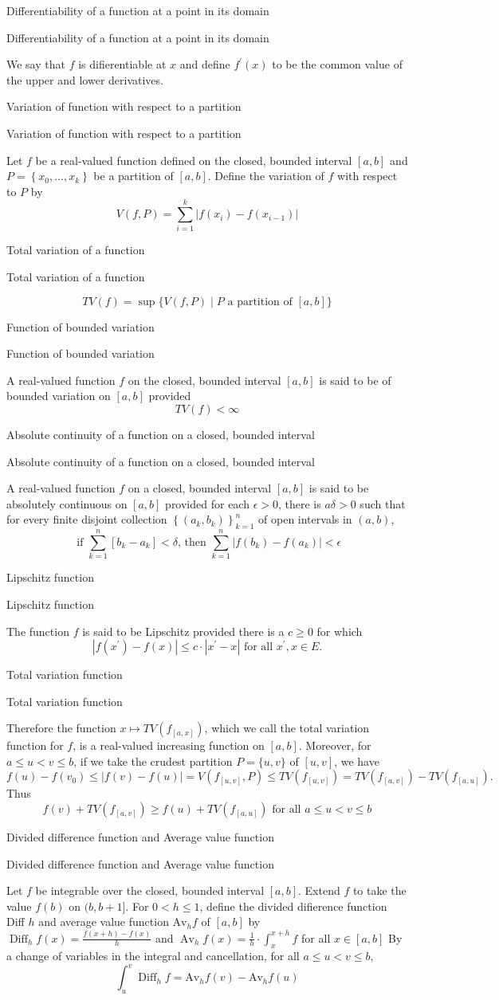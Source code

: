 \documentclass[17pt]{extarticle}
\newcommand{\boxset}[2]{\begin{mdframed}[style=darkQuesion]
#1
\end{mdframed}
\newpage
\begin{mdframed}[style=darkQuesion]
#1
  \end{mdframed}
\begin{mdframed}[style=darkAnswer]
#2
  \end{mdframed}
  \newpage
}
\begin{document}
\boxset{Differentiability of a function at a point in its domain}
{
We say that $f$ is difierentiable at $x$ and define $f^{\prime}(x)$ to be the common value of the upper and lower derivatives.
}%
\boxset{Variation of function with respect to a partition}
{
Let $f$ be a real-valued function defined on the closed, bounded interval $[a, b]$ and $P=\left\{x_{0}, \ldots, x_{k}\right\}$ be a partition of $[a, b]$. Define the variation of $f$ with respect to $P$ by
\[
V(f, P)=\sum_{i=1}^{k}\left|f\left(x_{i}\right)-f\left(x_{i-1}\right)\right|
\]
}%
\boxset{Total variation of a function}
{
\[T V(f)=\sup \{V(f, P) \mid P \text { a partition of }[a, b]\}\]
}%
\boxset{Function of bounded variation}
{
A real-valued function $f$ on the closed, bounded interval $[a, b]$ is said to be of bounded variation on $[a, b]$ provided
\[
T V(f)<\infty
\]
}%
\boxset{Absolute continuity of a function on a closed, bounded interval}
{
A real-valued function $f$ on a closed, bounded interval $[a, b]$ is said to be absolutely continuous on $[a, b]$ provided for each $\epsilon>0$, there is $a \delta>0$ such that for every finite disjoint collection $\left\{\left(a_{k}, b_{k}\right)\right\}_{k=1}^{n}$ of open intervals in $(a, b)$,
\[
\text { if } \sum_{k=1}^{n}\left[b_{k}-a_{k}\right]<\delta \text {, then } \sum_{k=1}^{n}\left|f\left(b_{k}\right)-f\left(a_{k}\right)\right|<\epsilon
\]
}%
\boxset{Lipschitz function}
{
The function $f$ is said to be Lipschitz provided there is a $c \geq 0$ for which
\[
\left|f\left(x^{\prime}\right)-f(x)\right| \leq c \cdot\left|x^{\prime}-x\right| \text { for all } x^{\prime}, x \in E .
\]
}%
\boxset{Total variation function}
{
Therefore the function $x \mapsto T V\left(f_{[a, x]}\right)$, which we call the total variation function for $f$, is a real-valued increasing function on $[a, b]$. Moreover, for $a \leq u<v \leq b$, if we take the crudest partition $P=\{u, v\}$ of $[u, v]$, we have
\[
f(u)-f\left(v_{0}\right) \leq|f(v)-f(u)|=V\left(f_{[u, v]}, P\right) \leq T V\left(f_{[u, v]}\right)=T V\left(f_{[a, v]}\right)-T V\left(f_{[a, u]}\right) .
\]
Thus
\[
f(v)+T V\left(f_{[a, v]}\right) \geq f(u)+T V\left(f_{[a, u]}\right) \text { for all } a \leq u<v \leq b
\]
}%
\boxset{Divided difference function and Average value function}
{
Let $f$ be integrable over the closed, bounded interval $[a, b]$. Extend $f$ to take the value $f(b)$ on $(b, b+1]$. For $0<h \leq 1$, define the divided difierence function Diff $h$ and average value function $\mathrm{Av}_{h} f$ of $[a, b]$ by
$\operatorname{Diff}_{h} f(x)=\frac{f(x+h)-f(x)}{h}$ and $\operatorname{Av}_{h} f(x)=\frac{1}{h} \cdot \int_{x}^{x+h} f$ for all $x \in[a, b]$
By a change of variables in the integral and cancellation, for all $a \leq u<v \leq b$,
\[
\int_{u}^{v} \operatorname{Diff}_{h} f=\mathrm{Av}_{h} f(v)-\mathrm{Av}_{h} f(u)
\]
}%
\end{document}
